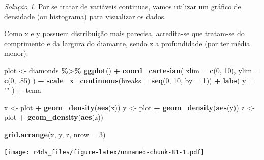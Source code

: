\documentclass[
]{latex/krantz}
\newenvironment{Shaded}{\begin{snugshade}}{\end{snugshade}}
\newcommand{\AttributeTok}[1]{\textcolor[rgb]{0.13,0.29,0.53}{#1}}
\newcommand{\DecValTok}[1]{\textcolor[rgb]{0.00,0.00,0.81}{#1}}
\newcommand{\FunctionTok}[1]{\textcolor[rgb]{0.13,0.29,0.53}{\textbf{#1}}}
\newcommand{\NormalTok}[1]{#1}
\newcommand{\OtherTok}[1]{\textcolor[rgb]{0.56,0.35,0.01}{#1}}
\newcommand{\SpecialCharTok}[1]{\textcolor[rgb]{0.81,0.36,0.00}{\textbf{#1}}}
\newcommand{\StringTok}[1]{\textcolor[rgb]{0.31,0.60,0.02}{#1}}
\theoremstyle{definition}
\theoremstyle{definition}
\theoremstyle{definition}
\theoremstyle{definition}
\theoremstyle{remark}
\newtheorem*{solution}{Solução}
\begin{document}
\begin{solution}
Por se tratar de variáveis continuas, vamos utilizar um gráfico de densidade (ou histograma) para visualizar os dados.

Como x e y possuem distribuição mais parecisa, acredita-se que tratam-se do comprimento e da largura do diamante, sendo z a profundidade (por ter média menor).

\begin{Shaded}
\begin{Highlighting}[]
\NormalTok{plot }\OtherTok{\textless{}{-}}\NormalTok{ diamonds }\SpecialCharTok{\%\textgreater{}\%} 
          \FunctionTok{ggplot}\NormalTok{() }\SpecialCharTok{+} 
            \FunctionTok{coord\_cartesian}\NormalTok{(}
              \AttributeTok{xlim =} \FunctionTok{c}\NormalTok{(}\DecValTok{0}\NormalTok{, }\DecValTok{10}\NormalTok{),}
              \AttributeTok{ylim =} \FunctionTok{c}\NormalTok{(}\DecValTok{0}\NormalTok{, .}\DecValTok{85}\NormalTok{)}
\NormalTok{            ) }\SpecialCharTok{+}
            \FunctionTok{scale\_x\_continuous}\NormalTok{(}\AttributeTok{breaks =} \FunctionTok{seq}\NormalTok{(}\DecValTok{0}\NormalTok{, }\DecValTok{10}\NormalTok{, }\AttributeTok{by =} \DecValTok{1}\NormalTok{)) }\SpecialCharTok{+}
            \FunctionTok{labs}\NormalTok{(}
              \AttributeTok{y =} \StringTok{""}
\NormalTok{            ) }\SpecialCharTok{+}
\NormalTok{            tema}

\NormalTok{x }\OtherTok{\textless{}{-}}\NormalTok{ plot }\SpecialCharTok{+} \FunctionTok{geom\_density}\NormalTok{(}\FunctionTok{aes}\NormalTok{(x))}
\NormalTok{y }\OtherTok{\textless{}{-}}\NormalTok{ plot }\SpecialCharTok{+} \FunctionTok{geom\_density}\NormalTok{(}\FunctionTok{aes}\NormalTok{(y))}
\NormalTok{z }\OtherTok{\textless{}{-}}\NormalTok{ plot }\SpecialCharTok{+} \FunctionTok{geom\_density}\NormalTok{(}\FunctionTok{aes}\NormalTok{(z))}

\FunctionTok{grid.arrange}\NormalTok{(x, y, z, }\AttributeTok{nrow =} \DecValTok{3}\NormalTok{)}
\end{Highlighting}
\end{Shaded}

\texttt{[image: r4ds\_files/figure-latex/unnamed-chunk-81-1.pdf]}


\end{solution}
\end{document}
